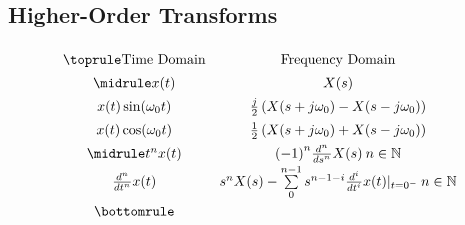 \subsection{Higher-Order Transforms}\label{subsec:Laplace_Higher_Order_Transforms}
\begin{center}
  \begin{equation*}
    \renewcommand{\arraystretch}{1.4}
    \begin{array}[h!tbp]{cc}
      \toprule
      \text{Time Domain} & \text{Frequency Domain} \\
      \midrule
      x(t) & X(s) \\
      x(t) \sin(\omega_{0} t) & \frac{j}{2} \left( X(s + j \omega_{0}) - X(s - j \omega_{0}) \right) \\
      x(t) \cos(\omega_{0} t) & \frac{1}{2} \left( X(s + j \omega_{0}) + X(s - j \omega_{0}) \right) \\
      \midrule
      t^{n} x(t) & {(-1)}^{n} \frac{d^{n}}{{ds}^{n}} X(s) \: n \in \NaturalNumbers \\
      \frac{d^{n}}{{dt}^{n}} x(t) & s^{n} X(s) - \sum\limits_{0}^{n-1} s^{n-1-i} \frac{d^{i}}{{dt}^{i}} x(t) \vert_{t=0^{-}} \: n \in \NaturalNumbers \\
      \bottomrule
    \end{array}
  \end{equation*}
\end{center}



